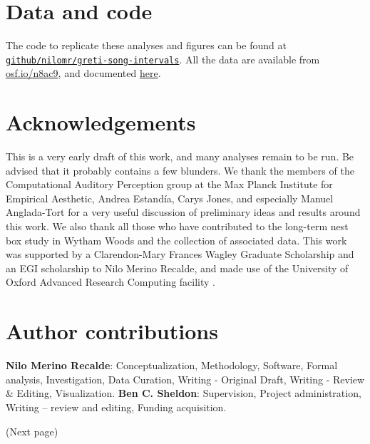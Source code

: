 \section{Data and code}

The code to replicate these analyses and figures can be found at \href{https://github.com/nilomr/greti-song-intervals}{\nolinkurl{github/nilomr/greti-song-intervals}}. All the data are available from \href{https://osf.io/n8ac9}{osf.io/n8ac9}, and documented \href{https://nilomr.github.io/great-tit-hits/}{here}.

\section{Acknowledgements}
This is a very early draft of this work, and many analyses remain to be run. Be advised that it probably contains a few blunders. We thank the members of the Computational Auditory Perception group at the Max Planck Institute for Empirical Aesthetic, Andrea Estandía, Carys Jones, and especially Manuel Anglada-Tort for a very useful discussion of preliminary ideas and results around this work. We also thank all those who have contributed to the long-term nest box study in Wytham Woods and the collection of associated data. This work was supported by a Clarendon-Mary Frances Wagley Graduate Scholarship and an EGI scholarship to Nilo Merino Recalde, and made use of the University of Oxford Advanced Research Computing facility \parencite{richards2015}.

\section{Author contributions}

\textbf{Nilo Merino Recalde}: Conceptualization, Methodology, Software, Formal analysis, Investigation, Data Curation, Writing - Original Draft, Writing - Review \& Editing, Visualization. 
\textbf{Ben C. Sheldon}: Supervision, Project administration, Writing -- review and editing, Funding acquisition.

\renewcommand{\cleardoublepage}{}
\renewcommand{\clearpage}{}
\printbibliography

\renewcommand{\cleardoublepage}{}
\renewcommand{\clearpage}{}
\supplementarysection
\noindent (Next page)


